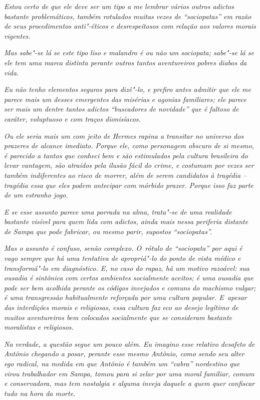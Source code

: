 \emph{Estou certo de que ele deve ser um tipo a me lembrar vários outros
adictos bastante problemáticos, também rotulados muitas vezes de
``sociopatas'' em razão de seus procedimentos anti"-éticos e
desrespeitosos com relação aos valores morais vigentes.}~

\emph{Mas sabe"-se lá se este tipo liso e malandro é ou não um sociopata;
sabe"-se lá se ele tem uma marca distinta perante outros tantos
aventureiros pobres diabos da vida.}~

\emph{Eu não tenho elementos seguros para dizê"-lo, e prefiro antes
admitir que ele me parece mais um desses emergentes das misérias e
agonias familiares; ele parece ser mais um dentre tantos adictos
``buscadores de novidade'' que é faltoso de caráter, voluptuoso e com
traços dionisíacos.}~

\emph{Ou ele seria mais um com jeito de Hermes rapina a transitar no
universo dos prazeres de alcance imediato. Porque ele, como personagem
obscuro de si mesmo, é parecido a tantos que conheci bem e são
estimulados pela cultura brasileira do levar vantagem, são atraídos pela
ilusão fácil do crime, e costumam por vezes ser também indiferentes ao
risco de morrer, além de serem candidatos à tragédia -- tragédia essa
que eles podem antecipar com mórbido prazer. Porque isso faz parte de um
estranho jogo.}

\emph{E se esse assunto parece uma porrada na alma, trata"-se de uma
realidade bastante visível para quem lida com adictos, ainda mais nessa
periferia distante de Sampa que pode fabricar, ou mesmo parir, supostos
``sociopatas''.}~

\emph{Mas o assunto é confuso, senão complexo. O~rótulo de ``sociopata''
por aqui é vago sempre que há uma tentativa de apropriá"-lo do ponto de
vista médico e transformá"-lo em diagnóstico. E, no caso do rapaz, há um
motivo razoável: sua ousadia é sintônica com certos ambientes
socialmente aceitos; é uma ousadia que pode ser bem acolhida perante os
códigos invejados e comuns do machismo vulgar; é uma transgressão
habitualmente reforçada por uma cultura popular. E~apesar das
interdições morais e religiosas, essa cultura faz eco ao desejo legítimo
de muitos aventureiros bem colocados socialmente que se consideram
bastante moralistas e religiosos.}~

\emph{Na verdade, a questão segue um pouco além. Eu imagino esse
relativo desafeto de Antônio chegando a posar, perante esse mesmo
Antônio, como sendo seu alter ego radical, na medida em que Antônio é
também um ``cabra'' nordestino que virou trabalhador em Sampa, tomou
para si zelar por uma moral familiar, comum e conservadora, mas tem
nostalgia e alguma inveja daquele a quem quer confiscar tudo na hora da
morte.}~

